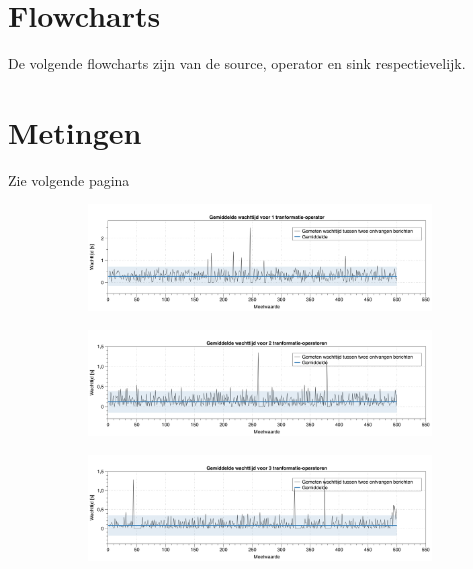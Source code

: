 \documentclass[twocolumn, a4paper]{article}
\begin{document}
\section{Flowcharts}
De volgende flowcharts zijn van de source, operator en sink respectievelijk.




\section{Metingen}
Zie volgende pagina
\begin{figure}[htb]
    \centering
    \begin{subfigure}{0.88\textwidth}
        \centering
        \includegraphics[width=\textwidth]{1_operator}        
    \end{subfigure}  
    \begin{subfigure}{0.88\textwidth}
        \centering
        \includegraphics[width=\textwidth]{2_operator}        
    \end{subfigure}  
    \begin{subfigure}{0.88\textwidth}
        \centering
        \includegraphics[width=\textwidth]{3_operator}        
    \end{subfigure}  

\end{figure}
\end{document}

